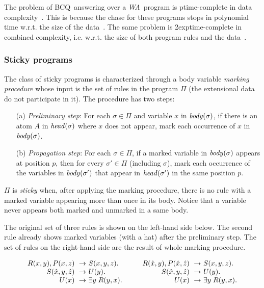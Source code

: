 \documentclass[format=acmsmall, review=false, screen=true]{acmart}
\newcommand{\bcq}{BCQ}
\newcommand{\prg}{\Pi}
\newcommand{\m}{\;\!\!}
\newcommand{\WA}{{\em W\m{}A}}
\newcommand{\exptime}{{\sc exptime}}
\newcommand{\ptime}{{\sc ptime}}
\begin{document}
{{The problem of \bcq \ answering over a \WA \ program is \ptime-complete in data complexity~\cite{fagin}. This is because the chase for these programs stops in polynomial time w.r.t. the size of the data~\cite{fagin}. The same problem is 2\exptime-complete in combined complexity, i.e. w.r.t. the size of both program rules and the data~\cite{kolaitis}.

\subsubsection{Sticky programs} \label{sec:sticky}

The class of sticky programs is characterized through a body variable {\em marking procedure} whose input is the set of rules in the program $\prg$ (the extensional data do not participate in it). The procedure has two steps:

\begin{itemize}
  \item[(a)] {\em Preliminary step}: For each $\sigma \in \prg$ and variable $x$ in ${\it body}(\sigma)$, if there is an atom $A$ in ${\it head}(\sigma)$ where $x$ does not appear, mark each occurrence of $x$ in ${\it body}(\sigma)$.
  \item[(b)] {\em Propagation step}: For each $\sigma \in \prg$, if a marked variable in ${\it body}(\sigma)$ appears at position $p$, then for every $\sigma' \in \prg$ (including $\sigma$), mark each occurrence of the variables in ${\it body}(\sigma')$ that appear in ${\it head}(\sigma')$ in the same position $p$.
\end{itemize}

$\prg$ is {\em sticky} when, after applying the marking procedure, there is no rule with a marked variable appearing more than once in its body. Notice that a variable never appears both marked and unmarked in a  same body.

\vspace{-2mm}
\begin{example} \label{example:sticky}
The original set of three rules is shown on the left-hand side below. The second rule already shows marked variables (with a hat) after the preliminary step. The set of rules on the right-hand side are the result of whole marking procedure.\end{example}\vspace{-7mm}

\vspace{2mm}
\[ \arraycolsep=0pt
\begin{array}{rl c rl}
R(x,y),P(x,z) ~\rightarrow~& S(x,y,z). &\hspace*{1.0cm}& R(\hat{x},y),P(\hat{x},\hat{z}) ~\rightarrow~& S(x,y,z).\\
S(\hat{x},y,\hat{z}) ~\rightarrow~& U(y).&\hspace*{1.0cm}&S(\hat{x},y,\hat{z}) ~\rightarrow~& U(y).\\
U(x) ~\rightarrow~& \exists y\;R(y,x).&\hspace*{1.0cm}&U(x) ~\rightarrow~& \exists y\;R(y,x).
\end{array}
\]

}}
\end{document}
